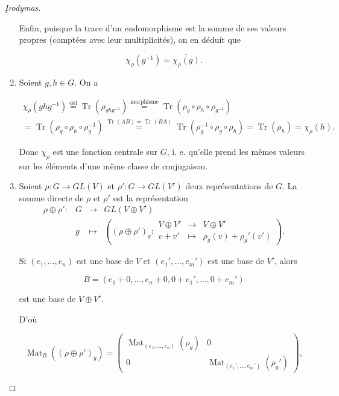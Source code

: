 \documentclass[french]{book}
\theoremstyle{definition}
\theoremstyle{remark}
\begin{document}
\begin{proof}[\k{I}rodymas]
\begin{enumerate}
    Enfin, puisque la trace d'un endomorphisme est la somme de ses valeurs propres (comptées avec leur multiplicités), on en déduit que

    \[\chi _{\rho}(g ^{-1}) = \overline{\chi _{\rho}(g)}. \]

    \item Soient \(g, h \in G\). On a

    \begin{gather*}
      \chi _{\rho}(g h g ^{-1}) \stackrel{\text{déf}}{=} \operatorname{Tr}(\rho _{ghg ^{-1}}) \stackrel{\text{morphisme}}{=} \operatorname{Tr}(\rho_g \circ \rho_h \circ \rho _{g ^{-1}}) \\
      = \operatorname{Tr}(\rho_g \circ \rho_h \circ \rho_g ^{-1}) \stackrel{\operatorname{Tr}(AB) = \operatorname{Tr}(BA)}{=} \operatorname{Tr}(\rho_g ^{-1} \circ \rho_g \circ \rho_h) = \operatorname{Tr}(\rho_h) = \chi _{\rho}(h).
    \end{gather*}

    Donc \(\chi _{\rho}\) est une fonction centrale sur \(G\), i. e. qu'elle prend les mêmes valeurs sur les éléments d'une même classe de conjugaison.

    \item Soient \(\rho : G \longrightarrow GL(V)\) et \(\rho' : G \longrightarrow GL(V')\) deux représentations de \(G\). La somme directe de \(\rho\) et \(\rho'\) est la représentation
     \[\begin{matrix}
      \rho \oplus \rho' : & G & \longrightarrow & GL(V \oplus V') \\
      \ & g & \longmapsto & \left( (\rho \oplus \rho')_g  : \begin{matrix}
      V \oplus V' & \longrightarrow & V \oplus V' \\
      v + v' & \longmapsto & \rho_g(v) + \rho_g'(v')
      \end{matrix}\right).
      \end{matrix}\]

      Si \((e_1, \dots, e_n)\) est une base de \(V\) et \((e_1', \dots, e_m')\) est une base de \(V'\), alors

      \[B = (e_1+0, \dots, e_n+0, 0 + e_1', \dots, 0 + e_m')\]

      est une base de \(V \oplus V'\).

      D'où

      \[\operatorname{Mat}_B((\rho \oplus \rho')_g) = \begin{pmatrix}
      \operatorname{Mat} _{(e_1, \dots, e_n)}(\rho_g) & 0 \\
      0 & \operatorname{Mat} _{(e_1', \dots, e_m')}(\rho_g')
      \end{pmatrix}, \]


\end{enumerate}
\end{proof}
\end{document}
